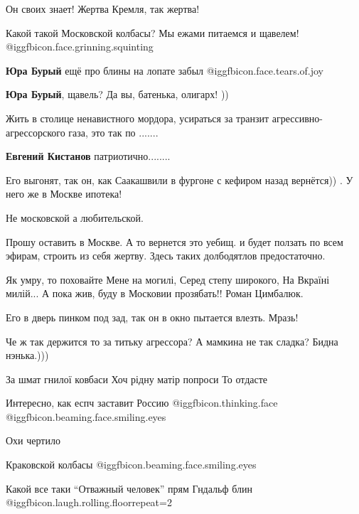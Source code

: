 \begin{itemize}
Он своих знает! Жертва Кремля, так жертва!


Какой такой Московской колбасы? Мы ежами питаемся и щавелем!  @igg{fbicon.face.grinning.squinting} 

\begin{itemize} %
\textbf{Юра Бурый} ещё про блины на лопате забыл @igg{fbicon.face.tears.of.joy} 

\textbf{Юра Бурый}, щавель? Да вы, батенька, олигарх! ))
\end{itemize} %

Жить в столице ненавистного мордора, усираться за транзит агрессивно-агрессорского газа, это так по .......

\textbf{Евгений Кистанов} патриотично........

Его выгонят, так он, как Саакашвили в фургоне с кефиром назад вернётся)) . У него же в Москве ипотека!

Не московской а любительской.


Прошу оставить в Москве. А то вернется это уебищ. и будет ползать по всем
эфирам, строить из себя жертву. Здесь таких долбодятлов предостаточно.


\obeycr
Як умру, то поховайте
Мене на могилі,
Серед степу широкого,
На Вкраїні милій...
А пока жив, буду в Московии прозябать!!
Роман Цимбалюк.
\restorecr

Его в дверь пинком под зад, так он в окно пытается влезть. Мразь!

Че ж так держится то за титьку агрессора? А мамкина не так сладка? Бидна нэнька.)))

За шмат гнилої ковбаси
Хоч рідну матір попроси
То отдасте


Интересно, как еспч заставит Россию @igg{fbicon.thinking.face}
@igg{fbicon.beaming.face.smiling.eyes} 

Охи чертило

Краковской колбасы  @igg{fbicon.beaming.face.smiling.eyes} 

Какой все таки \enquote{Отважный человек} прям Гндальф блин @igg{fbicon.laugh.rolling.floor}{repeat=2} 


\end{itemize}
